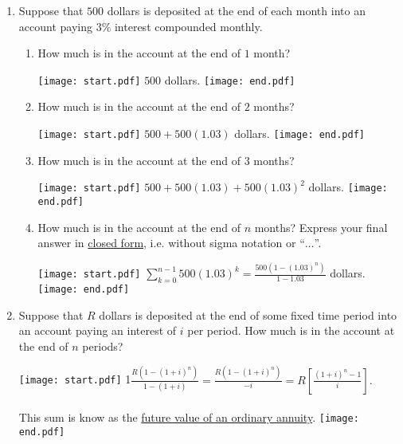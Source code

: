 \documentclass[12pt]{article}
\begin{document}
\begin{enumerate}
\begin{enumerate}
\item Suppose that $500$ dollars is deposited at the end of each month into an account paying $3\%$ interest compounded monthly.

\begin{enumerate}

\item How much is in the account at the end of $1$ month?

\texttt{[image: start.pdf]}
{{$500$ dollars.}}
\texttt{[image: end.pdf]}


\item How much is in the account at the end of $2$ months?

\texttt{[image: start.pdf]}
{{$500 + 500(1.03)$ dollars.}}
\texttt{[image: end.pdf]}


\item How much is in the account at the end of $3$ months?

\texttt{[image: start.pdf]}
{{$500 + 500(1.03) + 500(1.03)^2$ dollars.}}
\texttt{[image: end.pdf]}


\item How much is in the account at the end of $n$ months?  Express your final answer in \underline{closed form}, i.e. without sigma notation or ``$\ldots$''.

\texttt{[image: start.pdf]}
{{$\sum_{k=0}^{n-1}500(1.03)^{k}=\frac{500\left(1-(1.03)^n\right)}{1-1.03}$ dollars.}}
\texttt{[image: end.pdf]}


\end{enumerate}

\item Suppose that $R$ dollars is deposited at the end of some fixed time period into an account paying an interest of $i$ per period.   How much is in the account at the end of $n$ periods? 

\texttt{[image: start.pdf]}
{{{1\linewidth}{$\frac{R\left(1-(1+i)^n\right)}{1-(1+i)}=\frac{R\left(1-(1+i)^n\right)}{-i}=R\left[\frac{(1+i)^n-1}{i}\right]$.  \\ \\ This sum is know as the \underline{future value of an ordinary annuity}.}}}
\texttt{[image: end.pdf]}


\end{enumerate}

\end{enumerate}

\end{document}
